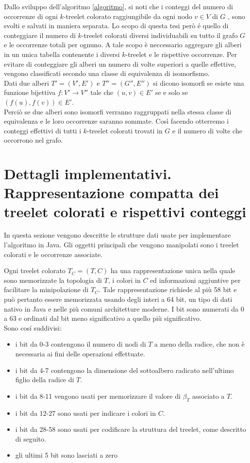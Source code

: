Dallo sviluppo dell'algoritmo \ref{algoritmo}, si noti che i conteggi del numero di occorrenze di ogni $ k $-treelet colorato raggiungibile da ogni nodo $ v\in V $ di $ G $ , sono svolti e salvati in maniera separata.
Lo scopo di questa tesi per\`o \'e quello di conteggiare il numero di $ k $-treelet colorati diversi individuabili su tutto il grafo $ G $ e le occorrenze totali per ognuno.
A tale scopo \`e neccessario aggregare gli alberi in un unica tabella contenente i diversi $ k $-treelet e le rispettive occorrenze.
Per evitare di conteggiare gli alberi un numero di volte superiori a quelle effettive, vengono classificati secondo una classe di equivalenza di isomorfismo.\\
 Dati due alberi $ T' = (V',E')$ e $ T''=(G'',E'') $ si dicono isomorfi se esiste una funzione bijettiva $ f : V' \rightarrow V'' $ tale che $ (u,v)\in E' $ se e solo se $ (f(u),f(v)) \in E' $.\\
Perci\`o se due alberi sono isomorfi verranno raggruppati nella stessa classe di equivalenza e le loro occorrenze saranno sommate.
Cos\`i facendo otterremo i conteggi effettivi di tutti i $ k $-treelet colorati trovati in $ G $ e il numero di volte che occorrono nel grafo. 


\section{Dettagli implementativi. Rappresentazione compatta dei treelet colorati e rispettivi conteggi}
\label{section 2}
In questa sezione vengono descritte le strutture dati usate per implementare l'algoritmo in Java.
Gli oggetti principali che vengono manipolati sono i treelet colorati e le occorrenze associate.

Ogni treelet colorato $ T_C = (T,C) $ ha una rappresentazione unica nella quale sono memorizzate la topologia di $ T $, i colori in $ C $ ed informazioni aggiuntive per facilitare la minipolazione di $T_C$.
Tale rappresentazione richiede al pi\`u 58 bit e pu\`o pertanto essere memorizzata usando degli interi a 64 bit, un tipo di dati nativo in Java e nelle pi\`u comuni architetture moderne.
I bit sono numerati da 0 a 63 e ordinati dal bit meno significativo a quello pi\`u significativo.\\
Sono cos\'i suddivisi:
\begin{itemize}
	\item i bit da 0-3 contengono il numero di nodi di $ T $ a meno della radice, che non \`e necessaria ai fini delle operazioni effettuate.
	\item i bit da 4-7 contengono la dimensione del sottoalbero radicato nell'ultimo figlio della radice di $ T $.
	\item i bit da 8-11 vengono usati per memorizzare il valore di $ \beta_T $ associato a $ T $.
	\item i bit da 12-27 sono usati per indicare i colori in $ C $.
	\item i bit da 28-58 sono usati per codificare la struttura del treelet, come descritto di seguito.
	\item gli ultimi 5 bit sono lasciati a zero
\end{itemize}\mbox{}\\

